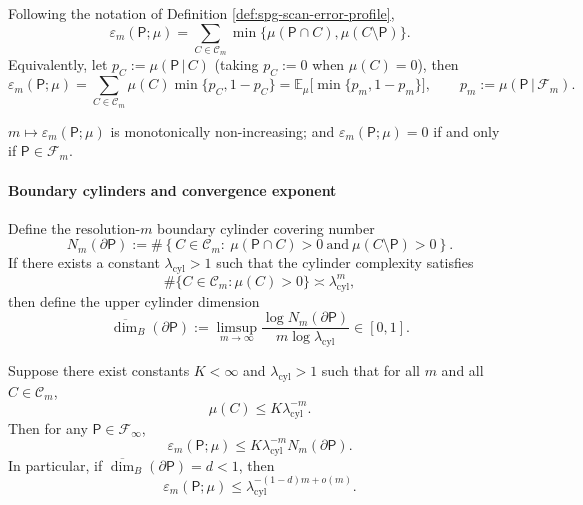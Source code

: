 \begin{proposition}\label{prop:spg-scan-error-cylinder}
Following the notation of Definition \ref{def:spg-scan-error-profile},
\[
\varepsilon_m(\mathsf P;\mu)
=\sum_{C\in\mathcal{C}_m}\min\{\mu(\mathsf P\cap C),\mu(C\setminus \mathsf P)\}.
\]
Equivalently, let $p_C:=\mu(\mathsf P\,|\,C)$ (taking $p_C:=0$ when $\mu(C)=0$), then
\[
\varepsilon_m(\mathsf P;\mu)
=\sum_{C\in\mathcal{C}_m}\mu(C)\min\{p_C,1-p_C\}
=\mathbb{E}_\mu\bigl[\min\{p_m,1-p_m\}\bigr],
\qquad
p_m:=\mu(\mathsf P\,|\,\mathcal{F}_m).
\]
\end{proposition}

\begin{corollary}\label{cor:spg-clarity-basic}
$m\mapsto\varepsilon_m(\mathsf P;\mu)$ is monotonically non-increasing; and $\varepsilon_m(\mathsf P;\mu)=0$ if and only if $\mathsf P\in\mathcal{F}_m$.
\end{corollary}

\paragraph{Boundary cylinders and convergence exponent}
\begin{definition}\label{def:spg-boundary-cylinder-dimension}
Define the resolution-$m$ boundary cylinder covering number
\[
N_m(\partial\mathsf P)
:=\#\left\{C\in\mathcal{C}_m:\ \mu(\mathsf P\cap C)>0\ \text{and}\ \mu(C\setminus \mathsf P)>0\right\}.
\]
If there exists a constant $\lambda_{\mathrm{cyl}}>1$ such that the cylinder complexity satisfies
\[
\#\{C\in\mathcal{C}_m:\mu(C)>0\}\asymp \lambda_{\mathrm{cyl}}^m,
\]
then define the upper cylinder dimension
\[
\overline{\dim}_B(\partial\mathsf P)
:=\limsup_{m\to\infty}\frac{\log N_m(\partial\mathsf P)}{m\log\lambda_{\mathrm{cyl}}}\in[0,1].
\]
\end{definition}

\begin{theorem}\label{thm:spg-clarity-boundary-dimension}
Suppose there exist constants $K<\infty$ and $\lambda_{\mathrm{cyl}}>1$ such that for all $m$ and all $C\in\mathcal{C}_m$,
\[
\mu(C)\le K\lambda_{\mathrm{cyl}}^{-m}.
\]
Then for any $\mathsf P\in\mathcal{F}_\infty$,
\[
\varepsilon_m(\mathsf P;\mu)\le K\lambda_{\mathrm{cyl}}^{-m}N_m(\partial\mathsf P).
\]
In particular, if $\overline{\dim}_B(\partial\mathsf P)=d<1$, then
\[
\varepsilon_m(\mathsf P;\mu)\le \lambda_{\mathrm{cyl}}^{-(1-d)m+o(m)}.
\]
\end{theorem}

